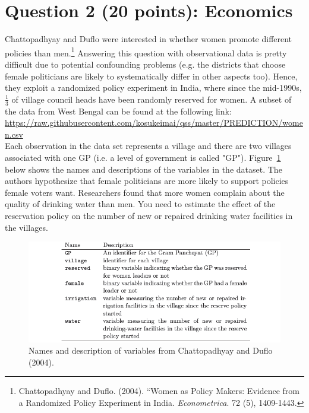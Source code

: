 \documentclass[12pt,letterpaper]{article}
\begin{document}
\section*{Question 2 (20 points): Economics}
Chattopadhyay and Duflo were interested in whether women promote different policies than men.\footnote{Chattopadhyay and Duflo. (2004). ``Women as Policy Makers: Evidence from a Randomized Policy Experiment in India. \textit{Econometrica}. 72 (5), 1409-1443.} Answering this question with observational data is pretty difficult due to potential confounding problems (e.g. the districts that choose female politicians are likely to systematically differ in other aspects too). Hence, they exploit a randomized policy experiment in India, where since the mid-1990s, $\frac{1}{3}$ of village council heads have been randomly reserved for women. A subset of the data from West Bengal can be found at the following link: \url{https://raw.githubusercontent.com/kosukeimai/qss/master/PREDICTION/women.csv}\\

\noindent Each observation in the data set represents a village and there are two villages associated with one GP (i.e. a level of government is called "GP"). Figure~\ref{fig:women_desc} below shows the names and descriptions of the variables in the dataset. The authors hypothesize that female politicians are more likely to support policies female voters want. Researchers found that more women complain about the quality of drinking water than men. You need to estimate the effect of the reservation policy on the number of new or repaired drinking water facilities in the villages.
\vspace{.5cm}
\begin{figure}[h!]
	\caption{\footnotesize{Names and description of variables from Chattopadhyay and Duflo (2004).}}
	\vspace{.5cm}
	\centering
	\label{fig:women_desc}
	\includegraphics[width=1.1\textwidth]{../women_desc.png}
\end{figure}		
\end{document}
